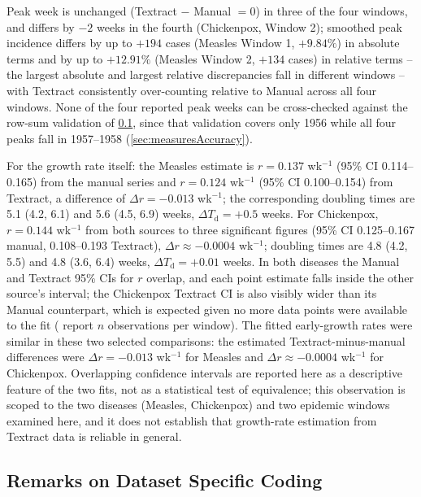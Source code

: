 \documentclass[12pt]{article}
\begin{document}
Peak week is unchanged (Textract $-$ Manual $= 0$) in three of the four windows, and differs by $-2$ weeks in the fourth (Chickenpox, Window 2); smoothed peak incidence differs by up to $+194$ cases (Measles Window 1, $+9.84\%$) in absolute terms and by up to $+12.91\%$ (Measles Window 2, $+134$ cases) in relative terms -- the largest absolute and largest relative discrepancies fall in different windows -- with Textract consistently over-counting relative to Manual across all four windows. None of the four reported peak weeks can be cross-checked against the row-sum validation of \cref{sec:hardcoding}, since that validation covers only 1956 while all four peaks fall in 1957--1958 (\cref{sec:measuresAccuracy}).

For the growth rate itself: the Measles estimate is $r = 0.137$ wk$^{-1}$ (95\% CI 0.114--0.165) from the manual series and $r = 0.124$ wk$^{-1}$ (95\% CI 0.100--0.154) from Textract, a difference of $\Delta r = -0.013$ wk$^{-1}$; the corresponding doubling times are 5.1 (4.2, 6.1) and 5.6 (4.5, 6.9) weeks, $\Delta T_{\mathrm{d}} = +0.5$ weeks. For Chickenpox, $r = 0.144$ wk$^{-1}$ from both sources to three significant figures (95\% CI 0.125--0.167 manual, 0.108--0.193 Textract), $\Delta r \approx -0.0004$ wk$^{-1}$; doubling times are 4.8 (4.2, 5.5) and 4.8 (3.6, 6.4) weeks, $\Delta T_{\mathrm{d}} = +0.01$ weeks. In both diseases the Manual and Textract 95\% CIs for $r$ overlap, and each point estimate falls inside the other source's interval; the Chickenpox Textract CI is also visibly wider than its Manual counterpart, which is expected given no more data points were available to the fit ( report $n$ observations per window). The fitted early-growth rates were similar in these two selected comparisons: the estimated Textract-minus-manual differences were $\Delta r = -0.013$ wk$^{-1}$ for Measles and $\Delta r \approx -0.0004$ wk$^{-1}$ for Chickenpox. Overlapping confidence intervals are reported here as a descriptive feature of the two fits, not as a statistical test of equivalence; this observation is scoped to the two diseases (Measles, Chickenpox) and two epidemic windows examined here, and it does not establish that growth-rate estimation from Textract data is reliable in general.


\subsection{Remarks on Dataset Specific Coding}\label{sec:hardcoding}
\end{document}
